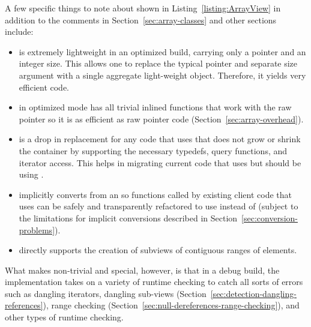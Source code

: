 \documentclass[pdf,ps2pdf,11pt]{SANDreport}
\begin{document}

A few specific things to note about {} shown in
Listing~\ref{listing:ArrayView} in addition to the comments in
Section~\ref{sec:array-classes} and other sections include:

\begin{itemize}

{}\item{}{} is extremely lightweight in an optimized build,
carrying only a pointer and an integer size.  This allows one to replace the
typical pointer and separate size argument with a single aggregate
light-weight object.  Therefore, it yields very efficient code.

{}\item{} in optimized mode has all trivial inlined
functions that work with the raw pointer so it is as efficient as raw
pointer code (Section~\ref{sec:array-overhead}).

{}\item{}{} is a drop in replacement for any code that uses
{} that does not grow or shrink the container by supporting
the necessary typedefs, query functions, and iterator access.  This helps in
migrating current code that uses {} but should be using
{}.

{}\item{}{} implicitly converts from an {} so
functions called by existing client code that uses {} can be
safely and transparently refactored to use {} instead of
{} (subject to the limitations for implicit conversions
described in Section~\ref{sec:conversion-problems}).

{}\item{} directly supports the creation of subviews of
contiguous ranges of elements.

\end{itemize}

What makes {} non-trivial and special, however, is that
in a debug build, the implementation takes on a variety of runtime
checking to catch all sorts of errors such as dangling iterators,
dangling sub-views (Section~\ref{sec:detection-dangling-references}),
range checking (Section~\ref{sec:null-dereferences-range-checking}),
and other types of runtime checking.
\end{document}
